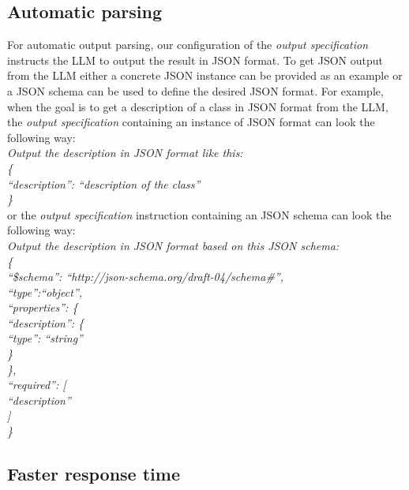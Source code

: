 \subsection{Automatic parsing}

For automatic output parsing, our configuration of the \emph{output specification} instructs the LLM to output the result in JSON format. To get JSON output from the LLM either a concrete JSON instance can be provided as an example or a JSON schema can be used to define the desired JSON format. For example, when the goal is to get a description of a class in JSON format from the LLM, the \emph{output specification} containing an instance of JSON format can look the following way: \\

\noindent{}\textit{Output the description in JSON format like this: \\
\{ \\
\null \quad ``description'': ``description of the class'' \\
\}} \\

\noindent{}or the \emph{output specification} instruction containing an JSON schema can look the following way: \\

\noindent{}\textit{Output the description in JSON format based on this JSON schema: \\
\{ \\
\null \quad ``\$schema'': ``http://json-schema.org/draft-04/schema\#'', \\
\null \quad  ``type'':``object'', \\
\null \quad  ``properties'': \{ \\
\null \quad \quad ``description'': \{ \\
\null \quad \quad \quad ``type'': ``string'' \\
\null \quad \quad   \} \\
\null \quad  \}, \\
\null \quad  ``required'': [ \\
\null \quad \quad   ``description'' \\
\null \quad  ] \\
\}} \\


\subsection{Faster response time}

